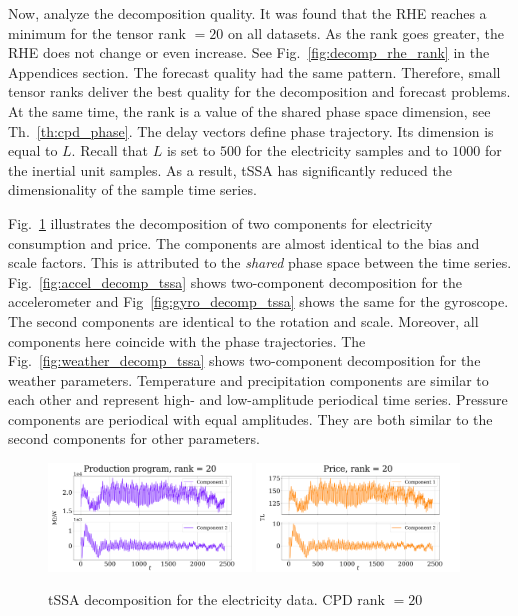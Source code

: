 \documentclass[referee, pdflatex, sn-mathphys-num]{sn-jnl}
\theoremstyle{definition}
\theoremstyle{plain}
\begin{document}
	Now, analyze the decomposition quality. It was found that the RHE reaches a minimum for the tensor rank $ = 20 $ on all datasets. As the rank goes greater, the RHE does not change or even increase. See Fig.~{\ref{fig:decomp_rhe_rank} in the Appendices section.} The forecast quality had the same pattern. Therefore, small tensor ranks deliver the best quality for the decomposition and forecast problems. At the same time, the rank is a value of the shared phase space dimension, see Th.~\ref{th:cpd_phase}. The delay vectors define phase trajectory. Its dimension is equal to $L$. Recall that $ L $ is set to $ 500 $ for the electricity samples and to $ 1000 $ for the inertial unit samples. As a result, tSSA has significantly reduced the dimensionality of the sample time series.
	
	Fig.~\ref{fig:electr_decomp_tssa} illustrates the decomposition of two components for electricity consumption and price. The components are almost identical to the bias and scale factors. This is attributed to the \emph{shared} phase space between the time series. Fig.~\ref{fig:accel_decomp_tssa} shows two-component decomposition for the accelerometer and Fig~\ref{fig:gyro_decomp_tssa} shows the same for the gyroscope. The second components are identical to the rotation and scale. Moreover, all components here coincide with the phase trajectories. The Fig.~{\ref{fig:weather_decomp_tssa}} shows two-component decomposition for the weather parameters. Temperature and precipitation components are similar to each other and represent high- and low-amplitude periodical time series. Pressure components are periodical with equal amplitudes. They are both similar to the second components for other parameters.
	
	\begin{figure}[h]
		\centering
		\includegraphics[width=0.48\textwidth, keepaspectratio]{Production program_decomp.png}
		\includegraphics[width=0.48\textwidth, keepaspectratio]{Price_decomp.png}
		\caption{tSSA decomposition for the electricity data. CPD rank $ = 20 $}\label{fig:electr_decomp_tssa}
	\end{figure}
	
\end{document}
